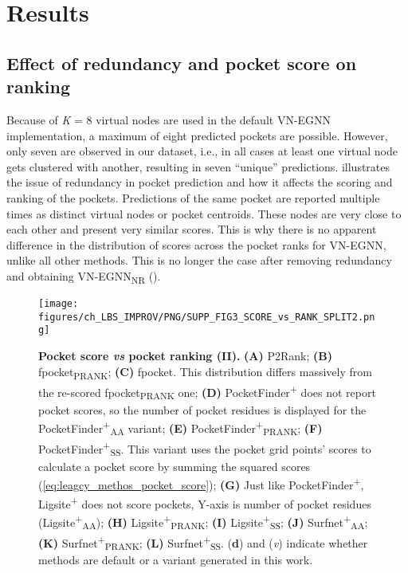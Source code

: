 \section{Results}

\subsection{Effect of redundancy and pocket score on ranking}

Because of \textit{K} = 8 virtual nodes are used in the default VN-EGNN implementation, a maximum of eight predicted pockets are possible. However, only seven are observed in our dataset, i.e., in all cases at least one virtual node gets clustered with another, resulting in seven ``unique'' predictions.  illustrates the issue of redundancy in pocket prediction and how it affects the scoring and ranking of the pockets. Predictions of the same pocket are reported multiple times as distinct virtual nodes or pocket centroids. These nodes are very close to each other and present very similar scores. This is why there is no apparent difference in the distribution of scores across the pocket ranks for VN-EGNN, unlike all other methods. This is no longer the case after removing redundancy and obtaining VN-EGNN\textsubscript{NR} ().

\begin{figure}[htb!]
    \centering
    \texttt{[image: figures/ch\_LBS\_IMPROV/PNG/SUPP\_FIG3\_SCORE\_vs\_RANK\_SPLIT2.png]}
    \caption[Pocket score \textit{vs} pocket ranking (II)]{\textbf{Pocket score \textit{vs} pocket ranking (II).} \textbf{(A)} P2Rank; \textbf{(B)} fpocket\textsubscript{PRANK}; \textbf{(C)} fpocket. This distribution differs massively from the re-scored fpocket\textsubscript{PRANK} one; \textbf{(D)} PocketFinder\textsuperscript{+} does not report pocket scores, so the number of pocket residues is displayed for the PocketFinder\textsuperscript{+}\textsubscript{AA} variant; \textbf{(E)} PocketFinder\textsuperscript{+}\textsubscript{PRANK}; \textbf{(F)} PocketFinder\textsuperscript{+}\textsubscript{SS}. This variant uses the pocket grid points’ scores to calculate a pocket score by summing the squared scores (\autoref{eq:leagcy_methos_pocket_score}); \textbf{(G)} Just like PocketFinder\textsuperscript{+}, Ligsite\textsuperscript{+} does not score pockets, Y-axis is number of pocket residues (Ligsite\textsuperscript{+}\textsubscript{AA}); \textbf{(H)} Ligsite\textsuperscript{+}\textsubscript{PRANK}; \textbf{(I)} Ligsite\textsuperscript{+}\textsubscript{SS}; \textbf{(J)} Surfnet\textsuperscript{+}\textsubscript{AA}; \textbf{(K)} Surfnet\textsuperscript{+}\textsubscript{PRANK}; \textbf{(L)} Surfnet\textsuperscript{+}\textsubscript{SS}. (\textbf{d}) and (\textit{v}) indicate whether methods are default or a variant generated in this work.}
    \label{fig:pocket_score_vs_rank2}
\end{figure}

